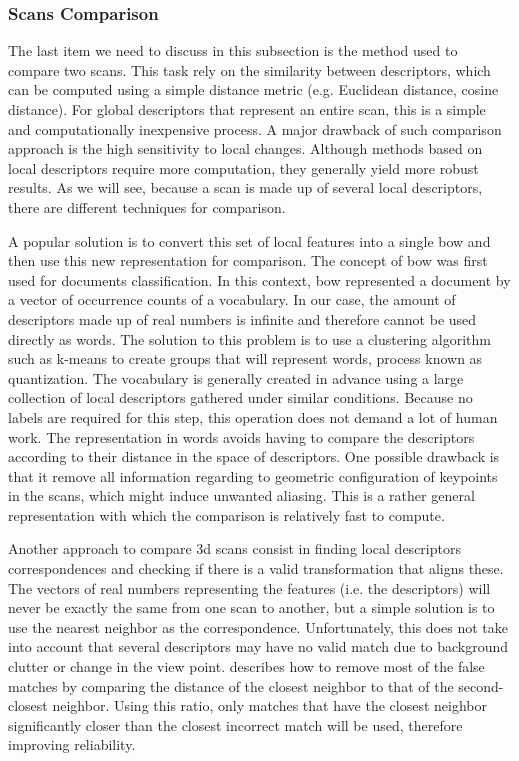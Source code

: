 \subsubsection{Scans Comparison}
\label{ssub:scans_comparison}

The last item we need to discuss in this subsection is the method used to compare two scans. This task rely on the similarity between descriptors, which can be computed using a simple distance metric (e.g. Euclidean distance, cosine distance). For global descriptors that represent an entire scan, this is a simple and computationally inexpensive process. A major drawback of such comparison approach is the high sensitivity to local changes. Although methods based on local descriptors require more computation, they generally yield more robust results. As we will see, because a scan is made up of several local descriptors, there are different techniques for comparison.

A popular solution is to convert this set of local features into a single \gls*{bow} and then use this new representation for comparison. The concept of \gls*{bow} was first used for documents classification. In this context, \gls*{bow} represented a document by a vector of occurrence counts of a vocabulary. In our case, the amount of descriptors made up of real numbers is infinite and therefore cannot be used directly as words. The solution to this problem is to use a clustering algorithm such as k-means to create groups that will represent words, process known as quantization. The vocabulary is generally created in advance using a large collection of local descriptors gathered under similar conditions. Because no labels are required for this step, this operation does not demand a lot of human work. The representation in words avoids having to compare the descriptors according to their distance in the space of descriptors. One possible drawback is that it remove all information regarding to geometric configuration of keypoints in the scans, which might induce unwanted aliasing. This is a rather general representation with which the comparison is relatively fast to compute.

Another approach to compare \gls*{3d} scans consist in finding local descriptors correspondences and checking if there is a valid transformation that aligns these. The vectors of real numbers representing the features (i.e. the descriptors) will never be exactly the same from one scan to another, but a simple solution is to use the nearest neighbor as the correspondence. Unfortunately, this does not take into account that several descriptors may have no valid match due to background clutter or change in the view point. \cite[Section 7.1]{Lowe2004} describes how to remove most of the false matches by comparing the distance of the closest neighbor to that of the second-closest neighbor. Using this ratio, only matches that have the closest neighbor significantly closer than the closest incorrect match will be used, therefore improving reliability.

